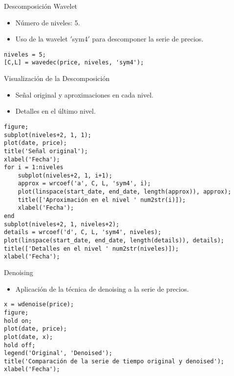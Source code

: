 \documentclass{beamer}
\begin{document}
\begin{frame}{Descomposición Wavelet}
\begin{itemize}
    \item Número de niveles: 5.
    \item Uso de la wavelet $'$sym4$'$ para descomponer la serie de precios.
\end{itemize}
\begin{verbatim}
niveles = 5;
[C,L] = wavedec(price, niveles, 'sym4');
\end{verbatim}

\end{frame}

\begin{frame}{Visualización de la Descomposición}
\begin{itemize}
    \item Señal original y aproximaciones en cada nivel.
    \item Detalles en el último nivel.
\end{itemize}
\begin{verbatim}
figure;
subplot(niveles+2, 1, 1);
plot(date, price);
title('Señal original');
xlabel('Fecha');
for i = 1:niveles
    subplot(niveles+2, 1, i+1);
    approx = wrcoef('a', C, L, 'sym4', i);
    plot(linspace(start_date, end_date, length(approx)), approx);
    title(['Aproximación en el nivel ' num2str(i)]);
    xlabel('Fecha');
end
subplot(niveles+2, 1, niveles+2);
details = wrcoef('d', C, L, 'sym4', niveles);
plot(linspace(start_date, end_date, length(details)), details);
title(['Detalles en el nivel ' num2str(niveles)]);
xlabel('Fecha');
\end{verbatim}
\end{frame}

\begin{frame}{Denoising}
\begin{itemize}
    \item Aplicación de la técnica de denoising a la serie de precios.
\end{itemize}
\begin{verbatim}
x = wdenoise(price);
figure;
hold on;
plot(date, price);
plot(date, x);
hold off;
legend('Original', 'Denoised');
title('Comparación de la serie de tiempo original y denoised');
xlabel('Fecha');
\end{verbatim}
\end{frame}
\end{document}

